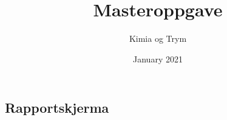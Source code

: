 \documentclass[twoside, openright, 10pt]{memoir}
\title{Masteroppgave}
\author{Kimia og Trym}
\date{January 2021}
\begin{document}

\frontmatter




\cleardoublepage
\tableofcontents*
\cleardoublepage
\listoffigures

\printglossary[type=\acronymtype, title=Akronymer]
\mainmatter









\appendixpage
\begin{appendices}
\chapter{Rapportskjerma} \label{rapportskjema}

\end{appendices}
\end{document}
